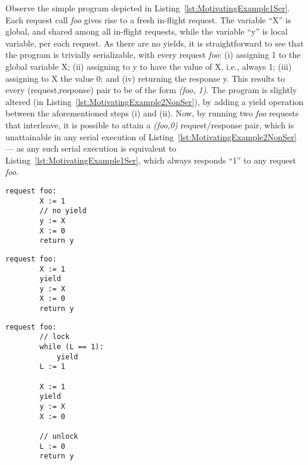 Observe the simple program depicted in Listing~\ref{lst:MotivatingExample1Ser}. Each request call \textit{foo} gives rise to a fresh in-flight request. The variable ``X'' is global, and shared among all in-flight requests, while the variable ``y'' is local variable, per each request. 
%
As there are no yields, it is straightforward to see that the program is trivially serializable, with every request \textit{foo}: (i) assigning 1 to the global variable X; (ii) assigning to y to have the value of X, i.e., always 1; (iii) assigning to X the value 0; and (iv) returning the response y. This results to every (request,response) pair to be of the form \textit{(foo, 1)}.
%
The program is slightly altered (in Listing~\ref{lst:MotivatingExample2NonSer}), by adding a yield operation between the aforementioned steps (i) and (ii). Now, by running two \textit{foo} requests that interleave, it is possible to attain a \textit{(foo,0)} request/response pair, which is unattainable in any serial execution of Listing~\ref{lst:MotivatingExample2NonSer} --- as any such serial execution is equivalent to Listing~\ref{lst:MotivatingExample1Ser}, which always responds ``1'' to any request \textit{foo}.


\noindent
\begin{minipage}[t]{0.45\textwidth}
	\begin{minipage}[t]{\textwidth}
		\begin{lstlisting}[caption={Without yield or lock (serializable)},
			label={lst:MotivatingExample1Ser}]
    request foo: 
        X := 1 
        // no yield
        y := X 
        X := 0
        return y 
		\end{lstlisting}
	\end{minipage}
	\vspace{1em}
	\begin{minipage}[t]{\textwidth}
		\begin{lstlisting}[caption={With yield (not serializable)},
			label={lst:MotivatingExample2NonSer}]
    request foo: 
        X := 1 
        yield 
        y := X 
        X := 0
        return y 	
		\end{lstlisting}
	\end{minipage}
\end{minipage}%
\hfill
\begin{minipage}[t]{0.45\textwidth}
	\begin{lstlisting}[caption={With yield and lock (serializable)},
		label={lst:MotivatingExample3Ser}]
    request foo: 
        // lock
        while (L == 1): 
            yield
        L := 1 

        X := 1
        yield
        y := X 
        X := 0

        // unlock    
        L := 0
        return y 
	\end{lstlisting}
\end{minipage}

